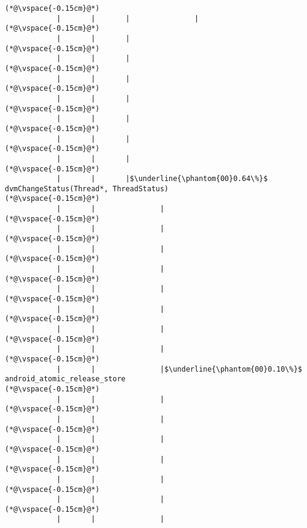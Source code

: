 \begin{lstlisting}[caption=20 viiteparametria Java$\to$C , label=profile:J2CBenchmark00206, numberbychapter=true, frame=lines, float, floatplacement=t]
(*@\vspace{-0.15cm}@*)
            |       |       |               |
(*@\vspace{-0.15cm}@*)
            |       |       |
(*@\vspace{-0.15cm}@*)
            |       |       |
(*@\vspace{-0.15cm}@*)
            |       |       |
(*@\vspace{-0.15cm}@*)
            |       |       |
(*@\vspace{-0.15cm}@*)
            |       |       |
(*@\vspace{-0.15cm}@*)
            |       |       |
(*@\vspace{-0.15cm}@*)
            |       |       |
(*@\vspace{-0.15cm}@*)
            |       |       |$\underline{\phantom{00}0.64\%}$ dvmChangeStatus(Thread*, ThreadStatus)
(*@\vspace{-0.15cm}@*)
            |       |               |
(*@\vspace{-0.15cm}@*)
            |       |               |
(*@\vspace{-0.15cm}@*)
            |       |               |
(*@\vspace{-0.15cm}@*)
            |       |               |
(*@\vspace{-0.15cm}@*)
            |       |               |
(*@\vspace{-0.15cm}@*)
            |       |               |
(*@\vspace{-0.15cm}@*)
            |       |               |
(*@\vspace{-0.15cm}@*)
            |       |               |
(*@\vspace{-0.15cm}@*)
            |       |               |$\underline{\phantom{00}0.10\%}$ android_atomic_release_store
(*@\vspace{-0.15cm}@*)
            |       |               |
(*@\vspace{-0.15cm}@*)
            |       |               |
(*@\vspace{-0.15cm}@*)
            |       |               |
(*@\vspace{-0.15cm}@*)
            |       |               |
(*@\vspace{-0.15cm}@*)
            |       |               |
(*@\vspace{-0.15cm}@*)
            |       |               |
(*@\vspace{-0.15cm}@*)
            |       |               |

\end{lstlisting}

